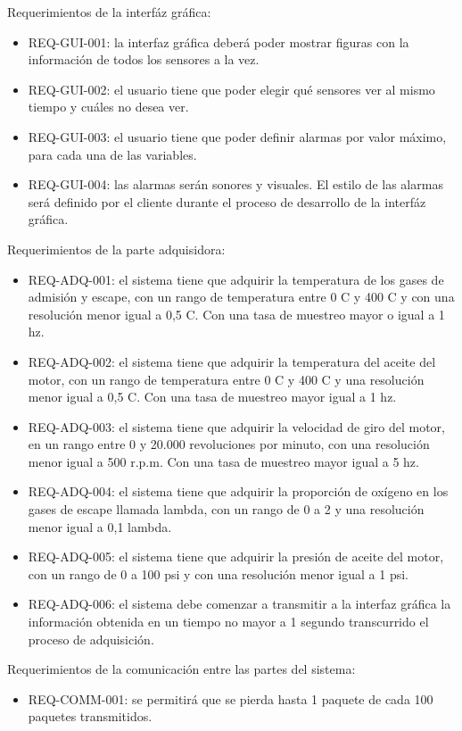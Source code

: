 Requerimientos de la interfáz gráfica:
\begin{itemize}
\item REQ-GUI-001: la interfaz gráfica deberá poder mostrar figuras con la información de todos los sensores a la vez.
\item REQ-GUI-002: el usuario tiene que poder elegir qué sensores ver al mismo tiempo y cuáles no desea ver.
\item REQ-GUI-003: el usuario tiene que poder definir alarmas por valor máximo, para cada una de las variables.
\item REQ-GUI-004: las alarmas serán sonores y visuales. El estilo de las alarmas será definido por el cliente durante el proceso de desarrollo de la interfáz gráfica.
\end{itemize}

Requerimientos de la parte adquisidora:
\begin{itemize}
\item REQ-ADQ-001: el sistema tiene que adquirir la temperatura de los gases de admisión y escape, con un rango de temperatura entre 0 \degree C y 400 \degree C y con una resolución menor igual a 0,5 \degree C. Con una tasa de muestreo mayor o igual a 1 hz.
\item REQ-ADQ-002: el sistema tiene que adquirir la temperatura del aceite del motor, con un rango de temperatura entre 0 \degree C y 400 \degree C y una resolución menor igual a 0,5 \degree C. Con una tasa de muestreo mayor igual a 1 hz.
\item REQ-ADQ-003: el sistema tiene que adquirir la velocidad de giro del motor, en un rango entre 0 y 20.000 revoluciones por minuto, con una resolución menor igual a 500 r.p.m. Con una tasa de muestreo mayor igual a 5 hz.
\item REQ-ADQ-004: el sistema tiene que adquirir la proporción de oxígeno en los gases de escape llamada lambda, con un rango de 0 a 2 y una resolución menor igual a 0,1 lambda.
\item REQ-ADQ-005: el sistema tiene que adquirir la presión de aceite del motor, con un rango de 0 a 100 psi y con una resolución menor igual a 1 psi.
\item REQ-ADQ-006: el sistema debe comenzar a transmitir a la interfaz gráfica la información obtenida en un tiempo no mayor a 1 segundo transcurrido el proceso de adquisición.
\end{itemize}

Requerimientos de la comunicación entre las partes del sistema:
\begin{itemize}
\item REQ-COMM-001: se permitirá que se pierda hasta 1 paquete de cada 100 paquetes transmitidos.
\end{itemize}